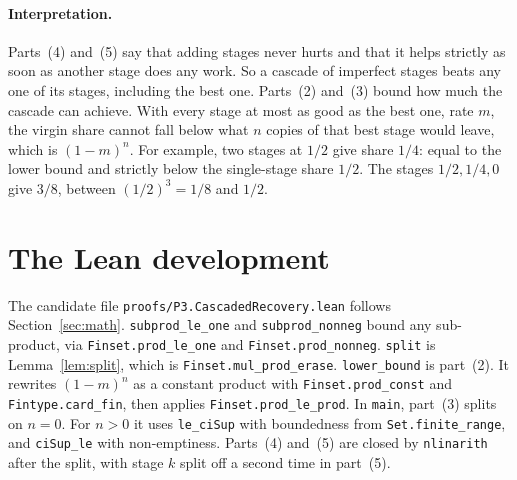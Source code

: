 \documentclass[11pt]{article}
\theoremstyle{definition}
\theoremstyle{remark}
\begin{document}
\paragraph{Interpretation.} Parts~(4) and~(5) say that adding stages never hurts and that it
helps strictly as soon as another stage does any work. So a cascade of imperfect stages beats
any one of its stages, including the best one. Parts~(2) and~(3) bound how much the cascade can
achieve. With every stage at most as good as the best one, rate $m$, the virgin share cannot fall
below what $n$ copies of that best stage would leave, which is $(1-m)^n$. For example, two stages
at $1/2$ give share $1/4$: equal to the lower bound and strictly below the single-stage share
$1/2$. The stages $1/2,1/4,0$ give $3/8$, between $(1/2)^3=1/8$ and $1/2$.

\section{The Lean development}
\label{sec:proof}
The candidate file \texttt{proofs/P3.CascadedRecovery.lean} follows Section~\ref{sec:math}.
\texttt{subprod\_le\_one} and \texttt{subprod\_nonneg} bound any sub-product, via
\texttt{Finset.prod\_le\_one} and \texttt{Finset.prod\_nonneg}. \texttt{split} is
Lemma~\ref{lem:split}, which is \texttt{Finset.mul\_prod\_erase}. \texttt{lower\_bound} is
part~(2). It rewrites $(1-m)^n$ as a constant product with \texttt{Finset.prod\_const} and
\texttt{Fintype.card\_fin}, then applies \texttt{Finset.prod\_le\_prod}. In \texttt{main}, part~(3)
splits on $n=0$. For $n>0$ it uses \texttt{le\_ciSup} with boundedness from
\texttt{Set.finite\_range}, and \texttt{ciSup\_le} with non-emptiness. Parts~(4) and~(5) are closed
by \texttt{nlinarith} after the split, with stage $k$ split off a second time in part~(5).
\end{document}
